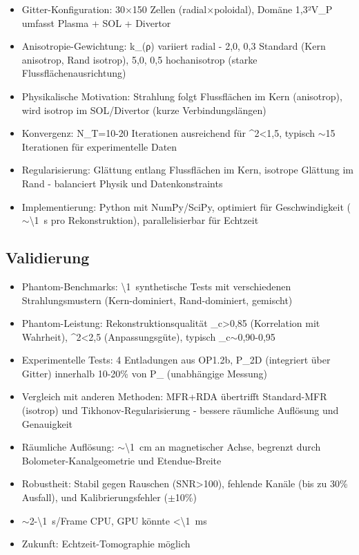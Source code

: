 \documentclass[11pt,a4paper]{article}
\begin{document}
\begin{itemize}
\item Gitter-Konfiguration: 30$\times$150 Zellen (radial$\times$poloidal), Domäne 1,3²V_P umfasst Plasma + SOL + Divertor
\item Anisotropie-Gewichtung: k_{}(ρ) variiert radial - {2,0, 0,3} Standard (Kern anisotrop, Rand isotrop), {5,0, 0,5} hochanisotrop (starke Flussflächenausrichtung)
\item Physikalische Motivation: Strahlung folgt Flussflächen im Kern (anisotrop), wird isotrop im SOL/Divertor (kurze Verbindungslängen)
\item Konvergenz: N_T=10-20 Iterationen ausreichend für \chi^2<1,5, typisch $\sim$15 Iterationen für experimentelle Daten
\item Regularisierung: Glättung entlang Flussflächen im Kern, isotrope Glättung im Rand - balanciert Physik und Datenkonstraints
\item Implementierung: Python mit NumPy/SciPy, optimiert für Geschwindigkeit ($\sim$\SI{\1}{s} pro Rekonstruktion), parallelisierbar für Echtzeit
\end{itemize}

\subsection{Validierung}

\begin{itemize}
\item Phantom-Benchmarks: \SI{\1}{s}ynthetische Tests mit verschiedenen Strahlungsmustern (Kern-dominiert, Rand-dominiert, gemischt)
\item Phantom-Leistung: Rekonstruktionsqualität \rho_c>0,85 (Korrelation mit Wahrheit), \chi^2<2,5 (Anpassungsgüte), typisch \rho_c$\sim$0,90-0,95
\item Experimentelle Tests: 4 Entladungen aus OP1.2b, P_2D (integriert über Gitter) innerhalb 10-20\% von P_{} (unabhängige Messung)
\item Vergleich mit anderen Methoden: MFR+RDA übertrifft Standard-MFR (isotrop) und Tikhonov-Regularisierung - bessere räumliche Auflösung und Genauigkeit
\item Räumliche Auflösung: $\sim$\SI{\1}{cm} an magnetischer Achse, begrenzt durch Bolometer-Kanalgeometrie und Etendue-Breite
\item Robustheit: Stabil gegen Rauschen (SNR>100), fehlende Kanäle (bis zu 30\% Ausfall), und Kalibrierungsfehler ($\pm$10\%)
\item $\sim$2-\SI{\1}{s}/Frame CPU, GPU könnte <\SI{\1}{m}s
\item Zukunft: Echtzeit-Tomographie möglich
\end{itemize}
\end{document}

